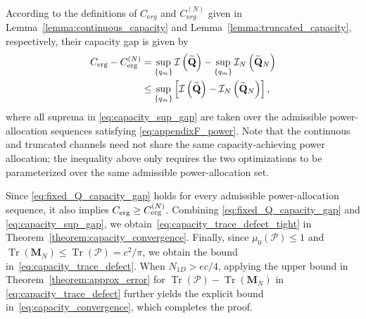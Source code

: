 \documentclass[lettersize,journal]{IEEEtran}
\theoremstyle{plain}
\begin{document}
According to the definitions of $C_{\mathrm erg}$ and $C_{\mathrm erg}^{(N)}$ given in Lemma~\ref{lemma:continuous_capacity} and Lemma~\ref{lemma:truncated_capacity}, respectively, their capacity gap is given by
\begin{align}
	C_{\rm erg}
	-
	C_{\rm erg}^{(N)}
	&=
	\sup_{\{q_m\}}
	\mathcal I
	\left(
	\widetilde{\mathbf Q}
	\right)
	-
	\sup_{\{q_m\}}
	\mathcal I_N
	\left(
	\widetilde{\mathbf Q}_N
	\right)
	\nonumber\\
	&\leq
	\sup_{\{q_m\}}
	\left[
	\mathcal I
	\left(
	\widetilde{\mathbf Q}
	\right)
	-
	\mathcal I_N
	\left(
	\widetilde{\mathbf Q}_N
	\right)
	\right],
	\label{eq:capacity_sup_gap}
\end{align}
where all suprema in \eqref{eq:capacity_sup_gap} are taken over
the admissible power-allocation sequences satisfying
\eqref{eq:appendixF_power}. Note that the continuous and
truncated channels need not share the same capacity-achieving
power allocation; the inequality above only requires the two
optimizations to be parameterized over the same admissible
power-allocation set.


Since \eqref{eq:fixed_Q_capacity_gap} holds for every admissible power-allocation sequence, it also implies $C_{\rm erg}\ge C_{\rm erg}^{(N)}$. Combining \eqref{eq:fixed_Q_capacity_gap} and
\eqref{eq:capacity_sup_gap}, we obtain~\eqref{eq:capacity_trace_defect_tight} in
Theorem~\ref{theorem:capacity_convergence}. Finally, since
$\mu_0(\mathcal P)\leq1$ and
$\operatorname{Tr}(\mathbf M_N)
\leq
\operatorname{Tr}(\mathcal P)=c^2/\pi$, we obtain the bound in~\eqref{eq:capacity_trace_defect}.
When $N_{1D}>ec/4$, applying the upper bound in Theorem~\ref{theorem:approx_error} for $\operatorname{Tr}(\mathcal{P})
-
\operatorname{Tr}(\mathbf{M}_N)$ in \eqref{eq:capacity_trace_defect} further yields the explicit bound in~\eqref{eq:capacity_convergence}, which completes the proof.
\end{document}
